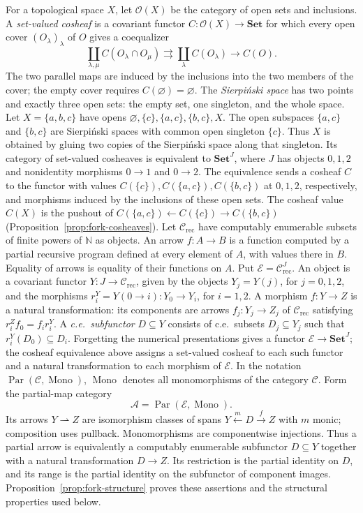 \documentclass[11pt]{article}
\newcommand{\N}{\mathbb N}
\begin{document}
For a topological space $X$, let $\mathcal O(X)$ be the category
of open sets and inclusions. A \emph{set-valued cosheaf} is a
covariant functor $C:\mathcal O(X)\to\mathbf{Set}$ for which
every open cover $(O_\lambda)_\lambda$ of $O$ gives a coequalizer
\cite[Definition 2.6]{CurryCosheaves}
\[
 \coprod_{\lambda,\mu} C(O_\lambda\cap O_\mu)
 \rightrightarrows \coprod_\lambda C(O_\lambda)
 \longrightarrow C(O).
\]
The two parallel maps are induced by the inclusions into the two
members of the cover; the empty cover requires
$C(\varnothing)=\varnothing$.
The \emph{Sierpi\'nski space} has two points and exactly three open
sets: the empty set, one singleton, and the whole space.
Let $X=\{a,b,c\}$ have opens
$\varnothing,\{c\},\{a,c\},\{b,c\},X$.
The open subspaces $\{a,c\}$ and $\{b,c\}$ are Sierpi\'nski spaces
with common open singleton $\{c\}$. Thus $X$ is obtained by gluing
two copies of the Sierpi\'nski space along that singleton.
Its category of set-valued cosheaves is equivalent to
$\mathbf{Set}^{J}$, where $J$ has objects $0,1,2$ and nonidentity
morphisms $0\to1$ and $0\to2$.
The equivalence sends a cosheaf $C$ to the functor with values
$C(\{c\}),C(\{a,c\}),C(\{b,c\})$ at $0,1,2$, respectively,
and morphisms induced by the inclusions of these open sets.
The cosheaf value $C(X)$ is the pushout of
$C(\{a,c\})\leftarrow C(\{c\})\to C(\{b,c\})$
(Proposition~\ref{prop:fork-cosheaves}).
Let $\mathcal C_{\mathrm{rec}}$ have computably enumerable subsets
of finite powers of $\N$ as objects. An arrow $f:A\to B$ is a
function computed by a partial recursive program defined at every
element of $A$, with values there in $B$. Equality of arrows is
equality of their functions on $A$.
Put $\mathcal E=\mathcal C_{\mathrm{rec}}^J$.
An object is a covariant functor $Y:J\to\mathcal C_{\mathrm{rec}}$,
given by the objects $Y_j=Y(j)$, for $j=0,1,2$, and the
morphisms $r_i^Y=Y(0\to i):Y_0\to Y_i$, for $i=1,2$.
A morphism $f:Y\to Z$ is a natural transformation: its components
are arrows $f_j:Y_j\to Z_j$ of $\mathcal C_{\mathrm{rec}}$ satisfying
$r_i^Zf_0=f_i r_i^Y$.
A \emph{c.e.\ subfunctor} $D\subseteq Y$ consists of c.e.\ subsets
$D_j\subseteq Y_j$ such that $r_i^Y(D_0)\subseteq D_i$.
Forgetting the numerical presentations gives a functor
$\mathcal E\to\mathbf{Set}^J$; the cosheaf equivalence above assigns
a set-valued cosheaf to each such functor and a natural transformation
to each morphism of $\mathcal E$.
In the notation $\operatorname{Par}(\mathcal C,\operatorname{Mono})$,
$\operatorname{Mono}$ denotes all monomorphisms of the category
$\mathcal C$. Form the partial-map category
\[
 \mathcal A=\operatorname{Par}(\mathcal E,\operatorname{Mono}).
\]
Its arrows $Y\rightharpoonup Z$ are isomorphism classes of spans
$Y\xleftarrow{m}D\xrightarrow{f}Z$ with $m$ monic; composition
uses pullback. Monomorphisms are componentwise injections.
Thus a partial arrow is equivalently a computably enumerable
subfunctor $D\subseteq Y$ together with a natural transformation
$D\to Z$. Its
restriction is the partial identity on $D$, and its range is the
partial identity on the subfunctor of component images.
Proposition~\ref{prop:fork-structure} proves these assertions and
the structural properties used below.
\end{document}
